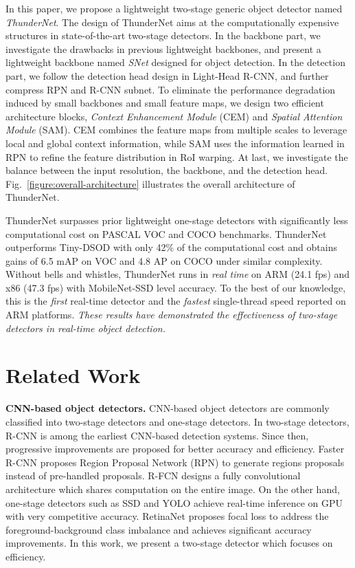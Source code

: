 \documentclass[10pt,twocolumn,letterpaper]{article}
\def\head#1{\noindent\textbf{#1}}
\begin{document}
In this paper, we propose a lightweight two-stage generic object detector named \emph{ThunderNet}.
The design of ThunderNet aims at the computationally expensive structures in state-of-the-art two-stage detectors.
In the backbone part, we investigate the drawbacks in previous lightweight backbones, and present a lightweight backbone named \emph{SNet} designed for object detection.
In the detection part, we follow the detection head design in Light-Head R-CNN, and further compress RPN and R-CNN subnet.
To eliminate the performance degradation induced by small backbones and small feature maps, we design two efficient architecture blocks, \emph{Context Enhancement Module} (CEM) and \emph{Spatial Attention Module} (SAM).
CEM combines the feature maps from multiple scales to leverage local and global context information, while SAM uses the information learned in RPN to refine the feature distribution in RoI warping.
At last, we investigate the balance between the input resolution, the backbone, and the detection head.
Fig.~\ref{figure:overall-architecture} illustrates the overall architecture of ThunderNet.




ThunderNet surpasses prior lightweight one-stage detectors with significantly less computational cost on PASCAL VOC \cite{everingham2010pascal} and COCO \cite{lin2014microsoft} benchmarks.
ThunderNet outperforms Tiny-DSOD \cite{li2018tiny} with only 42\% of the computational cost and obtains gains of 6.5 mAP on VOC and 4.8 AP on COCO under similar complexity.
Without bells and whistles, ThunderNet runs in \emph{real time} on ARM (24.1 fps) and x86 (47.3 fps) with MobileNet-SSD level accuracy.
To the best of our knowledge, this is the \emph{first} real-time detector and the \emph{fastest} single-thread speed reported on ARM platforms.
\emph{These results have demonstrated the effectiveness of two-stage detectors in real-time object detection.}


\section{Related Work}

\head{CNN-based object detectors.}
CNN-based object detectors are commonly classified into two-stage detectors and one-stage detectors.
In two-stage detectors, R-CNN \cite{girshick2014rich} is among the earliest CNN-based detection systems.
Since then, progressive improvements \cite{he2014spatial,girshick2015fast} are proposed for better accuracy and efficiency.
Faster R-CNN \cite{ren2015faster} proposes Region Proposal Network (RPN) to generate regions proposals instead of pre-handled proposals.
R-FCN \cite{dai2016r} designs a fully convolutional architecture which shares computation on the entire image.
On the other hand, one-stage detectors such as SSD \cite{liu2016ssd} and YOLO \cite{redmon2016you,redmon2017yolo9000,redmon2018yolov3} achieve real-time inference on GPU with very competitive accuracy.
RetinaNet \cite{lin2017focal} proposes focal loss to address the foreground-background class imbalance and achieves significant accuracy improvements.
In this work, we present a two-stage detector which focuses on efficiency.
\end{document}
